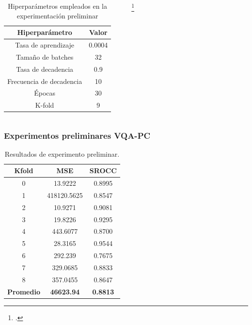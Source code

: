 \begin{frame}
\begin{columns}
  \begin{table}[htp]
    \small
    \begin{center}
      \begin{tabular}[c]{|c|c|}
        \hline
        \rowcolor[HTML]{FFC702}
        \textbf{Hiperparámetro} & \textbf{Valor} \\ 
        \hline 
        Tasa de aprendizaje &  0.0004 \\ 
        \hline 
        Tamaño de batches & 32 \\ 
        \hline 
        Tasa de decadencia & 0.9 \\ 
        \hline 
        Frecuencia de decadencia & 10 \\ 
        \hline 
        Épocas & 30 \\ 
        \hline 
        K-fold & 9 \\ 
        \hline 
      \end{tabular}
    \end{center}
    \caption[Hiperparámetros empleados en la experimentación preliminar.]{
      Hiperparámetros empleados en la experimentación preliminar\footnotemark[12]
    }
      \vspace{-.6cm}
    \label{tab:HiperSJTU}
  \end{table}
  \footcitetext{VQA-PC}
    \end{columns}
\end{frame}

\begin{frame}
  \frametitle{Experimentos preliminares VQA-PC}
\begin{table}[htp]
  \small
  \begin{center}
    \begin{tabular}[c]{|c|c|c|}
      \hline
      \rowcolor[HTML]{FFC702}
      \textbf{Kfold} & \textbf{MSE} & \textbf{SROCC} \\ 
      \hline 
      0 & 13.9222 & 0.8995 \\
      \hline 
      1 & 418120.5625 & 0.8547 \\ 
      \hline 
      2 & 10.9271 & 0.9081 \\
      \hline 
      3 & 19.8226 & 0.9295 \\ 
      \hline 
      4 & 443.6077 & 0.8700 \\ 
      \hline 
      5 & 28.3165 & 0.9544 \\ 
      \hline 
      6 & 292.239 & 0.7675 \\ 
      \hline 
      7 & 329.0685 & 0.8833 \\ 
      \hline 
      8 & 357.0455 & 0.8647 \\ 
      \hline
      \textbf{\cellcolor[HTML]{FFC702}Promedio} & \textbf{46623.94} & \textbf{0.8813} \\ 
      \hline
    \end{tabular}
  \end{center}
  \caption[Resultados de experimento preliminar.]{
    Resultados de experimento preliminar. 
  }
  \label{tab:PreTestResults}
\end{table}
\end{frame}

